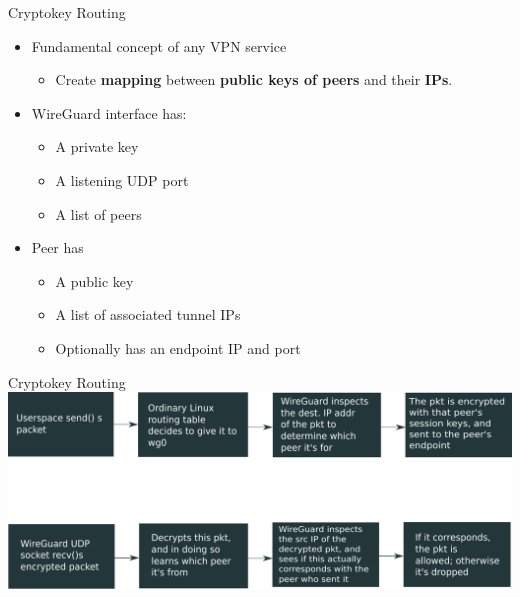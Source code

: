 \documentclass{beamer}
\begin{document}
    \begin{frame}{Cryptokey Routing}
        \begin{itemize}
            \item Fundamental concept of any VPN service
                \begin{itemize}
                    \item Create \textbf{mapping} between \textbf{public keys of peers} and their \textbf{IPs}.
                \end{itemize}
            \item WireGuard interface has:
                \begin{itemize}
                    \item A private key
                    \item A listening UDP port
                    \item A list of peers
                \end{itemize}
            \item Peer has
                \begin{itemize}
                    \item A public key
                    \item A list of associated tunnel IPs
                    \item Optionally has an endpoint IP and port
                \end{itemize}
        \end{itemize}
    \end{frame}
    \begin{frame}[fragile]{Cryptokey Routing}
    	\includegraphics[width=\textwidth]{crypto_route.pdf}
    \end{frame}
\end{document}
